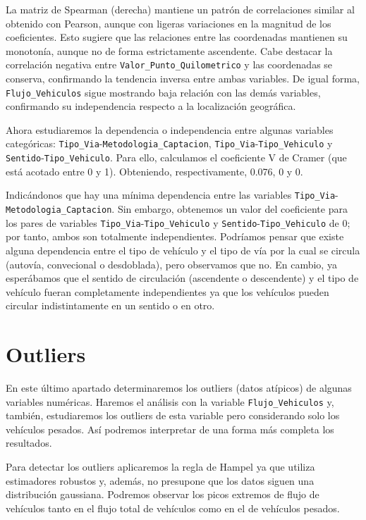 \documentclass[notspecified,article,submit,moreauthors,pdftex]{Definitions/mdpi}
\begin{document}
La matriz de Spearman (derecha) mantiene un patrón de correlaciones
similar al obtenido con Pearson, aunque con ligeras variaciones en la
magnitud de los coeficientes. Esto sugiere que las relaciones entre las
coordenadas mantienen su monotonía, aunque no de forma estrictamente
ascendente. Cabe destacar la correlación negativa entre
\texttt{Valor\_Punto\_Quilometrico} y las coordenadas se conserva,
confirmando la tendencia inversa entre ambas variables. De igual forma,
\texttt{Flujo\_Vehiculos} sigue mostrando baja relación con las demás
variables, confirmando su independencia respecto a la localización
geográfica.

Ahora estudiaremos la dependencia o independencia entre algunas
variables categóricas:
\texttt{Tipo\_Via}-\texttt{Metodologia\_Captacion},
\texttt{Tipo\_Via}-\texttt{Tipo\_Vehiculo} y
\texttt{Sentido}-\texttt{Tipo\_Vehiculo}. Para ello, calculamos el
coeficiente V de Cramer (que está acotado entre 0 y 1). Obteniendo,
respectivamente, 0.076, 0 y 0.

Indicándonos que hay una mínima dependencia entre las variables
\texttt{Tipo\_Via}-\texttt{Metodologia\_Captacion}. Sin embargo,
obtenemos un valor del coeficiente para los pares de variables
\texttt{Tipo\_Via}-\texttt{Tipo\_Vehiculo} y
\texttt{Sentido}-\texttt{Tipo\_Vehiculo} de 0; por tanto, ambos son
totalmente independientes. Podríamos pensar que existe alguna
dependencia entre el tipo de vehículo y el tipo de vía por la cual se
circula (autovía, convecional o desdoblada), pero observamos que no. En
cambio, ya esperábamos que el sentido de circulación (ascendente o
descendente) y el tipo de vehículo fueran completamente independientes
ya que los vehículos pueden circular indistintamente en un sentido o en
otro.

\section{Outliers}\label{outliers}

En este último apartado determinaremos los outliers (datos atípicos) de
algunas variables numéricas. Haremos el análisis con la variable
\texttt{Flujo\_Vehiculos} y, también, estudiaremos los outliers de esta
variable pero considerando solo los vehículos pesados. Así podremos
interpretar de una forma más completa los resultados.

Para detectar los outliers aplicaremos la regla de Hampel ya que utiliza
estimadores robustos y, además, no presupone que los datos siguen una
distribución gaussiana. Podremos observar los picos extremos de flujo de
vehículos tanto en el flujo total de vehículos como en el de vehículos
pesados.
\end{document}
